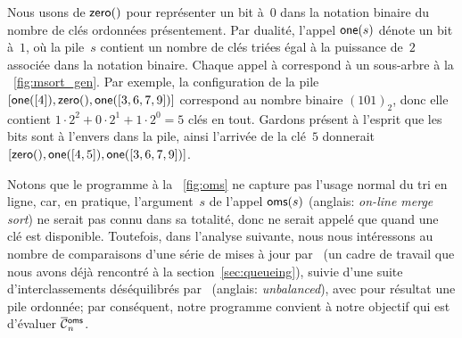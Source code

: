 Nous usons de \(\textsf{zero}()\) pour
représenter un bit à~\(0\) dans la notation binaire du nombre de clés
ordonnées présentement. Par dualité, l'appel
\(\textsf{one}(s)\) dénote un bit à~\(1\), où la
pile~\(s\) contient un nombre de clés triées égal à la puissance
de~\(2\) associée dans la notation binaire. Chaque appel à 
correspond à un sous-arbre à la
\fig~\vref{fig:msort_gen}. Par exemple, la configuration de la pile
\([\textsf{one}([4]), \textsf{zero}(), \textsf{one}([3,6,7,9])]\) correspond au
nombre binaire \((101)_2\), donc elle contient \(1 \cdot 2^2 + 0 \cdot
2^1 + 1 \cdot 2^0 = 5\) clés en tout. Gardons présent à l'esprit que
les bits sont à l'envers dans la pile, ainsi l'arrivée de la clé~\(5\)
donnerait \([\textsf{zero}(),\textsf{one}([4,5]),\textsf{one}([3,6,7,9])]\).

Notons que le programme à la \fig~\vref{fig:oms} ne capture pas
l'usage normal du tri en ligne, car, en pratique, l'argument~\(s\) de
l'appel \(\textsf{oms}(s)\) (anglais:
\emph{on-line merge sort}) ne serait pas connu dans sa totalité, donc
 ne serait appelé que quand une clé
est disponible. Toutefois, dans l'analyse suivante, nous nous
intéressons au nombre de comparaisons d'une série de mises à jour
par~ (un cadre de travail que nous
avons déjà rencontré à la section~\ref{sec:queueing}), suivie d'une
suite d'interclassements déséquilibrés
par~ (anglais: \emph{unbalanced}),
avec pour résultat une pile ordonnée; par conséquent, notre programme
convient à notre objectif qui est d'évaluer
\(\OC{\fun{oms}}{n}\).

